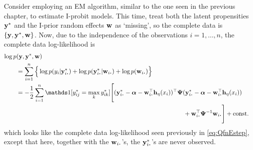 Consider employing an EM algorithm, similar to the one seen in the previous chapter, to estimate I-probit models.
This time, treat both the latent propensities ${\mathbf y}^*$ and the I-prior random effects ${\mathbf w}$ as `missing', so the complete data is $\{{\mathbf y},{\mathbf y}^*,{\mathbf w}\}$.
Now, due to the independence of the observations $i=1,\dots,n$, the complete data log-likelihood is
\begin{align*}
  \log p&(\by,\by^*,\bw) \\
  &= \sum_{i=1}^n \Big\{ 
  \log p(y_i|\by^*_{i \bigcdot}) + \log p(\by^*_{i \bigcdot}|\bw_{i \bigcdot}) + \log p(\bw_{i \bigcdot}) 
  \Big\} \\
  &= - \half \sum_{i=1}^n \ind[y_{ij}^* = \max_k y_{ik}^*] \Bigg[
    (\by^*_{i \bigcdot} - \balpha - \bw_{i \bigcdot}^\top\bh_\eta(x_i))^\top \bPsi (\by^*_{i \bigcdot} - \balpha - \bw_{i \bigcdot}^\top\bh_\eta(x_i)) \\
  &\hspace{9.5cm} + \bw_{i \bigcdot}^\top \bPsi^{-1} \bw_{i \bigcdot} \Bigg] 
   + \const
\end{align*}
which looks like the complete data log-likelihood seen previously in \cref{eq:QfnEstep}, except that here, together with the $\bw_{i \bigcdot}$'s, the $\by^*_{i \bigcdot}$'s are never observed.


